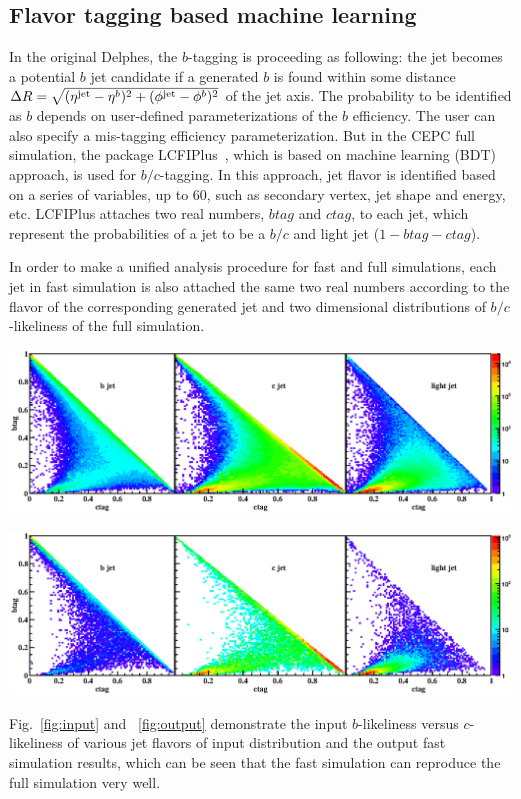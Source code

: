 \documentclass[a4paper,10pt,twoside]{cpc-hepnp}
\begin{document}
\begin{multicols}{2}
\section{Flavor tagging based machine learning\label{b-tagging}}
In the original {\textsf{Delphes}}, the $b$-tagging is proceeding as following:
the jet becomes a potential $b$ jet candidate if a generated $b$ is found within
some distance $\Delta R = \sqrt{(\eta^{\mbox{\scriptsize jet}}-\eta^b)^2+(\phi^{\mbox{\scriptsize jet}}-\phi^b)^2}$ of the jet axis.
The probability to be identified as $b$ depends on user-defined parameterizations of the $b$ efficiency.
The user can also specify a mis-tagging efficiency parameterization.
But in the CEPC full simulation, the package LCFIPlus~\cite{ref:lcfiplus},
which is based on machine learning (BDT) approach, is used for $b/c$-tagging.
In this approach, jet flavor is identified based on a series of variables, up to 60, such as secondary vertex, jet shape and energy, etc.
LCFIPlus attaches two real numbers, $btag$ and $ctag$, to each jet,
which represent the probabilities of a jet to be a $b/c$ and light jet ($1-btag-ctag$).

In order to make a unified analysis procedure for fast and full simulations,
each jet in fast simulation is also attached the same two real numbers according to the flavor of the corresponding generated jet
and two dimensional distributions of $b/c$-likeliness of the full simulation.
\begin{center}
\includegraphics[width=0.95\linewidth]{figs/input}
\end{center}
\begin{center}
\includegraphics[width=0.95\linewidth]{figs/output}
\end{center}
Fig.~\ref{fig:input} and ~\ref{fig:output} demonstrate the input $b$-likeliness versus $c$-likeliness 
of various jet flavors of input distribution and the output fast simulation results, 
which can be seen that the fast simulation can reproduce the full simulation very well.

\end{multicols}
\end{document}
